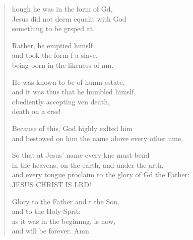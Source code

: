\settowidth{\versewidth}{and every tongue proclaim to the glory of God the Father: *}
\begin{verse}%
  \begin{patverse}
    hough he was in the form of Gd,\Flex\\
    Jesus did not deem equalit with God\Med\\
    something to be grsped at.
    
    Rather, he emptied himslf\Flex\\
    and took the form f a slave,\Med\\
    being born in the likeness of mn.
    
    He was known to be of humn estate,\Med\\
    and it was thus that he humbled himslf,\\
    obediently accepting ven death,\Med\\
    death on a crss!
    
    Because of this, God highly exlted him\Med\\
    and bestowed on him the name above every other nme,
    
    So that at Jesus’ name every kne must bend\Med\\
    in the heavens, on the earth, and under the arth,\\
    and every tongue proclaim to the glory of Gd the Father:\Med\\
    JESUS CHRIST IS LRD!

    Glory to the Father and t the Son,\Med\\
    and to the Holy Sp\pointup{\i}rit:\\
    as it was in the beginn\pointup{\i}ng, is now,\Med\\
    and will be forever. Amn.
  \end{patverse}
\end{verse}
